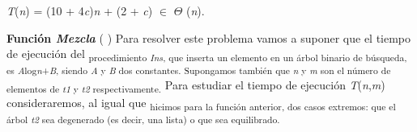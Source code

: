 \documentclass[12pt]{article}
\renewcommand{\_}{\kern-1.5pt\textunderscore\kern-1.5pt}
\begin{document}
\begin{adjustwidth}{2.06in}{2.06in}
{\fontsize{10pt}{12.0pt}\selectfont \textit{T}(\textit{n}) = (10 + 4\textit{c})\textit{n }+ (2 + \textit{c}) $ \in $  $ \Theta $ (\textit{n}). \par}\par

\end{adjustwidth}

\begin{adjustwidth}{0.57in}{0.57in}
\begin{justify}
{\fontsize{10pt}{12.0pt}\selectfont \textbf{Función \textit{Mezcla }}( ) Para resolver este problema vamos a suponer que el tiempo de ejecución del \textsubscript{procedimiento \textit{Ins}, que inserta un elemento en un árbol binario de búsqueda, es \textit{A}log\textit{n}+\textit{B}, siendo \textit{A }y \textit{B }dos constantes. Supongamos también que \textit{n }y \textit{m }son el número de elementos de \textit{t1 }y \textit{t2 }respectivamente. }Para estudiar el tiempo de ejecución \textit{T}(\textit{n},\textit{m}) consideraremos, al igual que \textsubscript{hicimos para la función anterior, dos casos extremos: que el árbol \textit{t2 }sea degenerado (es decir, una lista) o que sea equilibrado. }\par}
\end{justify}\par

\end{adjustwidth}
\end{document}
